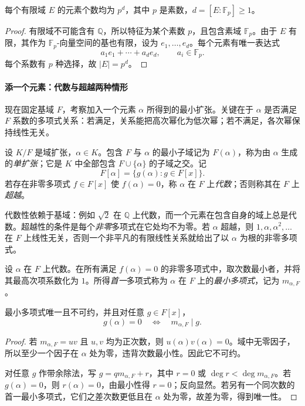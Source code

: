 \documentclass[lang=cn,a4paper,fontset=none,zihao=false,10pt,openany,twoside]{beautybook}
\numberwithin{algorithm}{chapter}
\begin{document}
\begin{corollary}[有限域的元素个数]
每个有限域 $E$ 的元素个数均为 $p^d$，其中 $p$ 是素数，$d=[E:\mathbb F_p]\ge1$。
\end{corollary}
\begin{proof}
有限域不可能含有 $\mathbb Q$，所以特征为某个素数 $p$，且包含素域 $\mathbb F_p$。由于 $E$ 有限，其作为 $\mathbb F_p$-向量空间的基也有限，设为 $e_1,\ldots,e_d$。每个元素有唯一表达式
\[
 a_1e_1+\cdots+a_de_d,\qquad a_i\in\mathbb F_p.
\]
每个系数有 $p$ 种选择，故 $|E|=p^d$。
\end{proof}

\paragraph{添一个元素：代数与超越两种情形}
现在固定基域 $F$，考察加入一个元素 $\alpha$ 所得到的最小扩张。关键在于 $\alpha$ 是否满足 $F$ 系数的多项式关系：若满足，关系能把高次幂化为低次幂；若不满足，各次幂保持线性无关。
\begin{definition}[单扩张与代数元]
设 $K/F$ 是域扩张，$\alpha\in K$。包含 $F$ 与 $\alpha$ 的最小子域记为 $F(\alpha)$，称为由 $\alpha$ 生成的\emph{单扩张}；它是 $K$ 中全部包含 $F\cup\{\alpha\}$ 的子域之交。记
\[
 F[\alpha]=\{g(\alpha):g\in F[x]\}.
\]
若存在非零多项式 $f\in F[x]$ 使 $f(\alpha)=0$，称 $\alpha$ 在 $F$ 上\emph{代数}；否则称其在 $F$ 上\emph{超越}。
\end{definition}
代数性依赖于基域：例如 $\sqrt2$ 在 $\mathbb Q$ 上代数，而一个元素在包含自身的域上总是代数。超越性的条件是每个\emph{非零}多项式在它处均不为零。若 $\alpha$ 超越，则 $1,\alpha,\alpha^2,\ldots$ 在 $F$ 上线性无关，否则一个非平凡的有限线性关系就给出了以 $\alpha$ 为根的非零多项式。

\begin{definition}[最小多项式]
设 $\alpha$ 在 $F$ 上代数。在所有满足 $f(\alpha)=0$ 的非零多项式中，取次数最小者，并将其最高次项系数化为 $1$。所得\emph{首一}多项式称为 $\alpha$ 在 $F$ 上的\emph{最小多项式}，记为 $m_{\alpha,F}$。
\end{definition}
\begin{proposition}[最小多项式控制代入的核]\label{prop:minimal-polynomial}
最小多项式唯一且不可约，并且对任意 $g\in F[x]$，
\[
 g(\alpha)=0\quad\Longleftrightarrow\quad m_{\alpha,F}\mid g.
\]
\end{proposition}
\begin{proof}
若 $m_{\alpha,F}=uv$ 且 $u,v$ 均为正次数，则 $u(\alpha)v(\alpha)=0$。域中无零因子，所以至少一个因子在 $\alpha$ 处为零，违背次数最小性。因此它不可约。

对任意 $g$ 作带余除法，写 $g=qm_{\alpha,F}+r$，其中 $r=0$ 或 $\deg r<\deg m_{\alpha,F}$。若 $g(\alpha)=0$，则 $r(\alpha)=0$，由最小性得 $r=0$；反向显然。若另有一个同次数的首一最小多项式，它们之差次数更低且在 $\alpha$ 处为零，故差为零，得到唯一性。
\end{proof}
\end{document}

